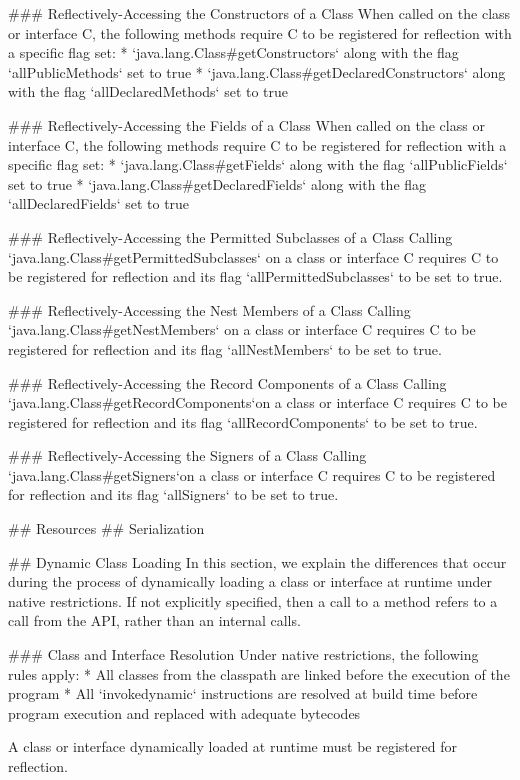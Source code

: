 ### Reflectively-Accessing the Constructors of a Class
When called on the class or interface C, the following methods require C to be registered for reflection with
a specific flag set:
* `java.lang.Class#getConstructors` along with the flag `allPublicMethods` set to true
* `java.lang.Class#getDeclaredConstructors` along with the flag `allDeclaredMethods` set to true

### Reflectively-Accessing the Fields of a Class
When called on the class or interface C, the following methods require C to be registered for reflection with
a specific flag set:
* `java.lang.Class#getFields` along with the flag `allPublicFields` set to true
* `java.lang.Class#getDeclaredFields` along with the flag `allDeclaredFields` set to true

### Reflectively-Accessing the Permitted Subclasses of a Class
Calling `java.lang.Class#getPermittedSubclasses` on a class or interface C requires C to be registered for reflection
and its flag `allPermittedSubclasses` to be set to true.

### Reflectively-Accessing the Nest Members of a Class
Calling `java.lang.Class#getNestMembers` on a class or interface C requires C to be registered for reflection 
and its flag `allNestMembers` to be set to true.

### Reflectively-Accessing the Record Components of a Class
Calling `java.lang.Class#getRecordComponents`on a class or interface C requires C to be registered for reflection
and its flag `allRecordComponents` to be set to true.

### Reflectively-Accessing the Signers of a Class
Calling `java.lang.Class#getSigners`on a class or interface C requires C to be registered for reflection
and its flag `allSigners` to be set to true.

## Resources
## Serialization

## Dynamic Class Loading
In this section, we explain the differences that occur during the process of dynamically loading
a class or interface at runtime under native restrictions. 
If not explicitly specified, then a call to a method refers to a call from the API, 
rather than an internal calls.

### Class and Interface Resolution
Under native restrictions, the following rules apply: 
* All classes from the classpath are linked before the execution of the program
* All `invokedynamic` instructions are resolved at build time before program execution and replaced
  with adequate bytecodes

A class or interface dynamically loaded at runtime must be registered for reflection.

